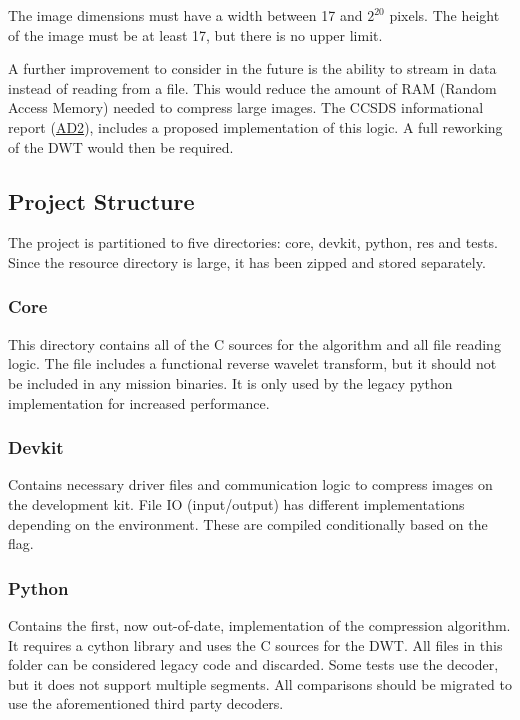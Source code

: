 \documentclass[12pt, a4paper]{article}
\begin{document}
\medskip
\noindent
The image dimensions must have a width between 17 and \(2^{20}\) pixels. 
The height of the image must be at least 17, but there is no upper limit.

\medskip
\noindent
A further improvement to consider in the future is the ability to stream in data instead of reading from a file. 
This would reduce the amount of RAM (Random Access Memory) needed to compress large images. 
The CCSDS informational report (\hyperref[lnk:g]{AD2}), includes a proposed implementation of this logic. 
A full reworking of the DWT would then be required.

\newpage
\subsection{Project Structure}
The project is partitioned to five directories: core, devkit, python, res and tests. 
Since the resource directory is large, it has been zipped and stored separately.

\noindent
\subsubsection{Core} 
This directory contains all of the C sources for the algorithm and all file reading logic. 
The  file includes a functional reverse wavelet transform, 
but it should not be included in any mission binaries. 
It is only used by the legacy python implementation for increased performance.

\noindent
\subsubsection{Devkit} 
Contains necessary driver files and communication logic to compress images on the 
 development kit. 
File IO (input/output) has different implementations depending on the environment. 
These are compiled conditionally based on the  flag. 

\noindent
\subsubsection{Python} 
Contains the first, now out-of-date, implementation of the compression algorithm. 
It requires a cython library and uses the C sources for the DWT. 
All files in this folder can be considered legacy code and discarded. 
Some tests use the  decoder, but it does not support multiple segments. 
All comparisons should be migrated to use the aforementioned third party decoders.
\end{document}
